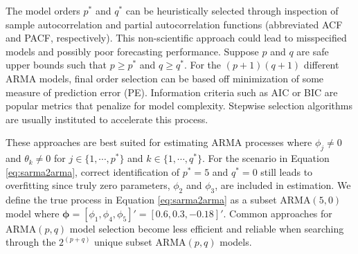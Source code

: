 The model orders $p^*$ and $q^*$ can be heuristically selected through inspection of sample autocorrelation and partial autocorrelation functions (abbreviated ACF and PACF, respectively). This non-scientific approach could lead to misspecified models and possibly poor forecasting performance. Suppose $p$ and $q$ are safe upper bounds such that $p\geq p^*$ and $q\geq q^*$. For the $(p+1)(q+1)$ different ARMA models, final order selection can be based off minimization of some measure of prediction error (PE). Information criteria such as AIC \citep{Akaike1974} or BIC \citep{Schwarz1978} are popular metrics that penalize for model complexity. Stepwise selection algorithms are usually instituted to accelerate this process.

These approaches are best suited for estimating ARMA processes where $\phi_j\neq 0$ and $\theta_k \neq 0$ for $j\in\{1,\cdots,p^*\}$ and $k\in\{1,\cdots,q^*\}$. For the scenario in Equation \ref{eq:sarma2arma}, correct identification of $p^*=5$ and $q^*=0$ still leads to overfitting since truly zero parameters, $\phi_2$ and $\phi_3$, are included in estimation. We define the true process in Equation \ref{eq:sarma2arma} as a subset ARMA$(5,0)$ model where $\bm{\phi}=[\phi_1,\phi_4,\phi_5]'=[0.6,0.3,-0.18]'$. Common approaches for ARMA$(p,q)$ model selection become less efficient and reliable when searching through the $2^{(p+q)}$ unique subset ARMA$(p,q)$ models.	


